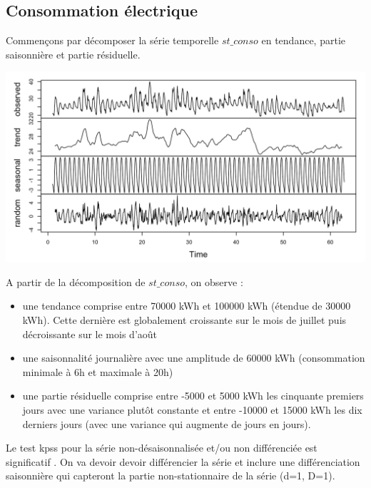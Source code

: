 \documentclass{article}
\theoremstyle{definition}
\theoremstyle{remark}
\begin{document}
\subsection{Consommation électrique}
Commençons par décomposer la série temporelle $st\_conso$ en tendance, partie saisonnière et partie résiduelle.
\FloatBarrier
\begin{minipage}{.5\textwidth}
\hspace{-1cm}
\includegraphics[width=0.95\linewidth]{fig2.png}
    \label{fig:enter-label}
\end{minipage}
\begin{minipage}{.5\textwidth}
    A partir de la décomposition de $st\_conso$, on observe :
    \begin{itemize}
    \item une tendance comprise entre 70000 kWh et 100000 kWh (étendue de 30000 kWh). Cette dernière est globalement croissante sur le mois de juillet puis décroissante sur le mois d’août
    \item une saisonnalité journalière avec une amplitude de 60000 kWh  (consommation minimale à 6h et maximale à 20h)
    \item une partie résiduelle comprise entre -5000 et 5000 kWh les cinquante premiers jours avec une variance plutôt constante et entre -10000 et 15000 kWh les dix derniers jours (avec une variance qui augmente de jours en jours).
    \end{itemize}
\end{minipage}
\newpage
Le test kpss pour la série non-désaisonnalisée et/ou non différenciée est significatif . On va devoir devoir différencier la série et inclure une différenciation saisonnière qui capteront la partie non-stationnaire de la série (d=1, D=1).\newline
\end{document}
